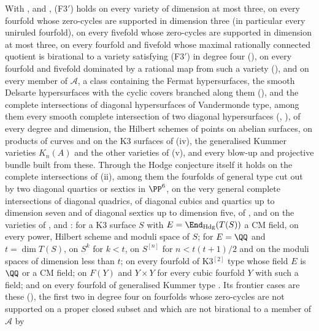 \begin{remark}\label{rem:f3primefrontier}
With ,  and ,
\textup{(F3$'$)} holds on every variety of dimension at most three, on every
fourfold whose zero-cycles are supported in dimension three (in particular
every uniruled fourfold), on every fivefold whose zero-cycles are supported
in dimension at most three, on every fourfold and fivefold whose maximal
rationally connected quotient is birational to a variety satisfying
\textup{(F3$'$)} in degree four (), on every
fourfold and fivefold dominated by a rational map from such a variety
(), and on
every member of $\mathcal{A}$, a class containing the Fermat
hypersurfaces, the smooth Delsarte hypersurfaces with the cyclic covers
branched along them (), and the complete intersections
of diagonal hypersurfaces of Vandermonde type, among them every smooth
complete intersection of two diagonal hypersurfaces (,
), of every degree and dimension, the Hilbert schemes of points on
abelian surfaces, on products of curves and on the K3 surfaces of
(iv), the generalised Kummer varieties $K_{n}(A)$ and the
other varieties of (v), and every blow-up and projective bundle
built from these. Through the Hodge conjecture itself it holds on the
complete intersections of (ii), among them the
fourfolds of general type cut out by two diagonal quartics or sextics in
$\PP^{6}$, on the very general complete intersections of diagonal quadrics,
of diagonal cubics and quartics up to dimension seven and of diagonal
sextics up to dimension five, of , and on the
varieties of ,  and
: for a K3 surface $S$ with
$E=\End_{\mathrm{Hdg}}(T(S))$ a CM field, on every power, Hilbert scheme and
moduli space of $S$; for $E=\QQ$ and $t=\dim T(S)$, on $S^{k}$ for $k<t$, on
$S^{[n]}$ for $n<t(t+1)/2$ and on the moduli spaces of dimension less than
$t$; on every fourfold of K3$^{[2]}$ type whose field $E$ is $\QQ$ or a CM
field; on $F(Y)$ and $Y\times Y$ for every cubic fourfold $Y$ with such a
field; and on every fourfold of generalised Kummer type \cite{FV25}. Its
frontier cases are these (), the first two in
degree four on fourfolds whose zero-cycles are not supported on a proper
closed subset and which are not birational to a member of $\mathcal{A}$ by

\end{remark}
